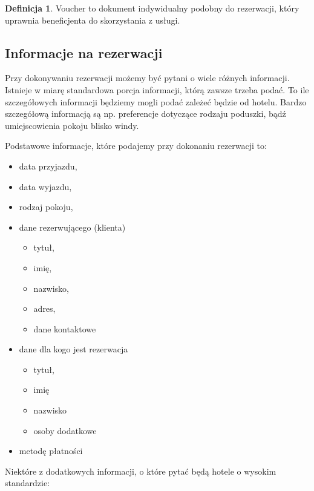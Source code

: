 \documentclass[a4paper,onecolumn,oneside,11pt,wide,floatssmall]{mwrep}
\theoremstyle{definition}
\newtheorem{defn}{Definicja}[section]
\theoremstyle{plain}%
\theoremstyle{remark}
\begin{document}
\begin{defn}{Voucher} 
to dokument indywidualny podobny do rezerwacji, który uprawnia beneficjenta 
do skorzystania z usługi.
\end{defn}

\subsection{Informacje na rezerwacji}
\label{chap1:info-na-rezerwacji}
Przy dokonywaniu rezerwacji możemy być pytani o wiele różnych informacji. 
Istnieje w miarę standardowa porcja informacji, którą zawsze trzeba podać. 
To ile szczegółowych informacji będziemy mogli podać zależeć będzie od 
\mbox{hotelu.} Bardzo szczegółową informacją są np. preferencje dotyczące 
rodzaju poduszki, bądź umiejscowienia pokoju blisko windy.

Podstawowe informacje, które podajemy przy dokonaniu rezerwacji to:

\begin{itemize}
  \item data przyjazdu,
  \item data wyjazdu,
  \item rodzaj pokoju,
  \item dane rezerwującego (klienta)
  \begin{itemize}
    \item tytuł,
    \item imię,
    \item nazwisko, 
    \item adres, 
    \item dane kontaktowe
  \end{itemize} 
  \item dane dla kogo jest rezerwacja
  \begin{itemize}
    \item tytuł,
    \item imię
    \item nazwisko
    \item osoby dodatkowe
  \end{itemize}
  \item metodę płatności
\end{itemize}

Niektóre z dodatkowych informacji, o które pytać będą hotele o wysokim 
standardzie:
\end{document}
